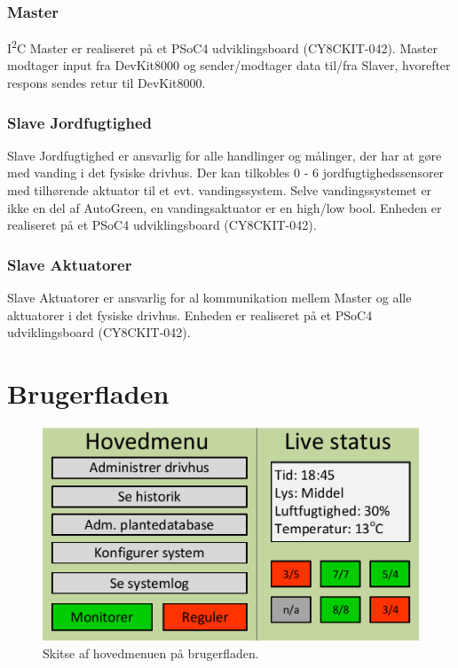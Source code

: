 \subsubsection{\IIC Master}
I\textsuperscript{2}C Master er realiseret på et PSoC4 udviklingsboard (CY8CKIT-042). 
\IIC Master modtager input fra DevKit8000 og sender/modtager data til/fra \IIC Slaver, hvorefter respons sendes retur til DevKit8000.
\subsubsection{\IIC Slave Jordfugtighed}
\IIC Slave Jordfugtighed er ansvarlig for alle handlinger og målinger, der har at gøre med vanding i det fysiske drivhus. Der kan tilkobles 0 - 6 jordfugtighedssensorer med tilhørende aktuator til et evt. vandingssystem. Selve vandingssystemet er ikke en del af AutoGreen, en vandingsaktuator er en high/low bool. Enheden er realiseret på et PSoC4 udviklingsboard (CY8CKIT-042).
\subsubsection{\IIC Slave Aktuatorer}
\IIC Slave Aktuatorer er ansvarlig for al kommunikation mellem \IIC Master og alle aktuatorer i det fysiske drivhus. Enheden er realiseret på et PSoC4 udviklingsboard (CY8CKIT-042).

\clearpage


\section{Brugerfladen}
\begin{figure}[h]
\centering
\includegraphics[width=\textwidth - 3 cm]{../fig/gui_skitse}
\caption{Skitse af hovedmenuen på brugerfladen.}
\label{fig:gui_skitse}
\end{figure}

